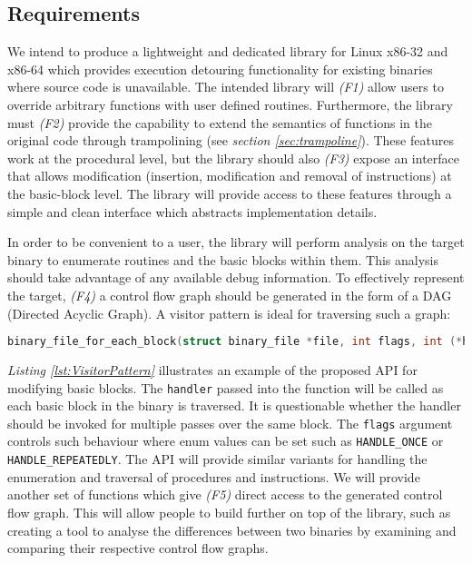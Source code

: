 \subsection{Requirements}
\label{sec:Requirements}

We intend to produce a lightweight and dedicated library for Linux x86-32 and x86-64 which provides execution detouring functionality for existing binaries where source code is unavailable. The intended library will \emph{(F1)} allow users to override arbitrary functions with user defined routines. Furthermore, the library must  \emph{(F2)} provide the capability to extend the semantics of functions in the original code through trampolining (see \emph{section \ref{sec:trampoline}}). These features work at the procedural level, but the library should also \emph{(F3)} expose an interface that allows modification (insertion, modification and removal of instructions) at the basic-block level. The library will provide access to these features through a simple and clean interface which abstracts implementation details.

In order to be convenient to a user, the library will perform analysis on the target binary to enumerate routines and the basic blocks within them. This analysis should take advantage of any available debug information. To effectively represent the target, \emph{(F4)} a control flow graph should be generated in the form of a DAG (Directed Acyclic Graph). A visitor pattern is ideal for traversing such a graph:

\begin{lstlisting}[language=C,caption={API for traversal of control flow graph},label={lst:VisitorPattern}]
binary_file_for_each_block(struct binary_file *file, int flags, int (*handler)(struct block *block, struct context *ctx));
\end{lstlisting}

\emph{Listing \ref{lst:VisitorPattern}} illustrates an example of the proposed API for modifying basic blocks. The \texttt{handler} passed into the function will be called as each basic block in the binary is traversed. It is questionable whether the handler should be invoked for multiple passes over the same block. The \texttt{flags} argument controls such behaviour where enum values can be set such as \texttt{HANDLE\_ONCE} or \texttt{HANDLE\_REPEATEDLY}. The API will provide similar variants for handling the enumeration and traversal of procedures and instructions. We will provide another set of functions which give \emph{(F5)} direct access to the generated control flow graph. This will allow people to build further on top of the library, such as creating a tool to analyse the differences between two binaries by examining and comparing their respective control flow graphs.

